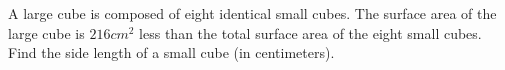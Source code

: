 A large cube is composed of eight identical small cubes. The surface area of the large cube is $216cm^{2}$ less than the total surface area of the eight small cubes. Find the side length of a small cube (in centimeters).
